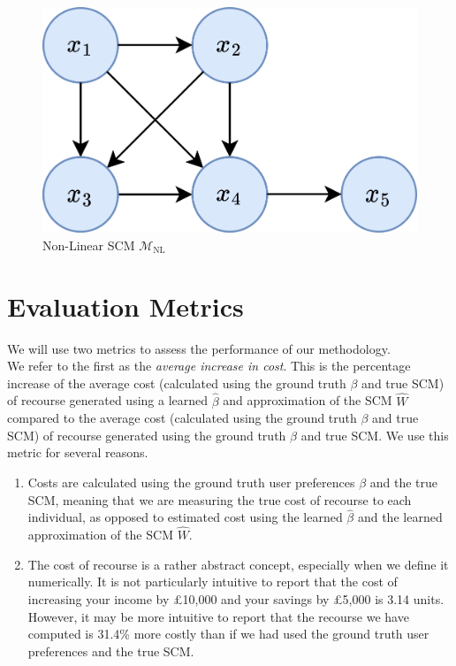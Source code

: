 \begin{figure}[!htb]
	\centering
	\includegraphics[width=0.5\linewidth]{images/draw.io/non_linear_scm.png}
	\caption{Non-Linear SCM $\mathcal{M}_{\text{NL}}$}
	\label{fig:non_linear_scm}
\end{figure}


\section{Evaluation Metrics} 

We will use two metrics to assess the performance of our methodology.\\

We refer to the first as the \textit{average increase in cost}. This is the percentage increase of the average cost (calculated using the ground truth $\beta$ and true SCM) of recourse generated using a learned $\hat{\beta}$ and approximation of the SCM $\hat{W}$ compared to the average cost (calculated using the ground truth $\beta$ and true SCM) of recourse generated using the ground truth $\beta$ and true SCM. We use this metric for several reasons.\\

\begin{enumerate}
	\item Costs are calculated using the ground truth user preferences $\beta$ and the true SCM, meaning that we are measuring the true cost of recourse to each individual, as opposed to estimated cost using the learned $\hat{\beta}$ and the learned approximation of the SCM $\hat{W}$.
	
	\item The cost of recourse is a rather abstract concept, especially when we define it numerically. It is not particularly intuitive to report that the cost of increasing your income by £10,000 and your savings by £5,000 is 3.14 units. However, it may be more intuitive to report that the recourse we have computed is 31.4\% more costly than if we had used the ground truth user preferences and the true SCM.
\end{enumerate}

